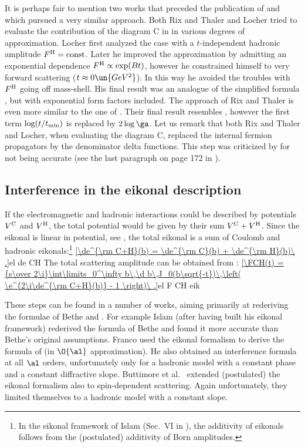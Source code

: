 It is perhaps fair to mention two works that preceded the publication of \WaY{}  and which pursued a very similar approach. Both Rix and Thaler  and Locher  tried to evaluate the contribution of the diagram C in  in various degrees of approximation. Locher first analyzed the case with a $t$-independent hadronic amplitude $F^{\rm H}=\hbox{const}$. Later he improved the approximation by admitting an exponential dependence $F^{\rm H} \propto \exp(Bt)$, however he constrained himself to very forward scattering ($t\approx 0\un{GeV^2}$). In this way he avoided the troubles with $F^{\rm H}$ going off mass-shell. His final result was an analogue of the simplified \WaY{} formula , but with exponential form factors included. The approach of Rix and Thaler is even more similar to the one of \WaY. Their final result resembles , however the first term $\log(t/t_{\rm min})$ is replaced by $2\log\ga$. Let us remark that both Rix and Thaler and Locher, when evaluating the diagram C, replaced the internal fermion propagators by the denominator delta functions. This step was criticized by \WaY{} for not being accurate (see the last paragraph on page 172 in ).



\subsection[int eik]{Interference in the eikonal description}

If the electromagnetic and hadronic interactions could be described by potentials $V^{\rm C}$ and $V^{\rm H}$, the total potential would be given by their sum $V^{\rm C} + V^{\rm H}$. Since the eikonal is linear in potential, see , the total eikonal is a sum of Coulomb and hadronic eikonals:\footnote{%
In the eikonal framework of Islam (Sec.~VI in ), the additivity of eikonals follows from the (postulated) additivity of Born amplitudes.
}
\eqref{\de^{\rm C+H}(b) = \de^{\rm C}(b) + \de^{\rm H}(b)\ .}{el de CH}
The total scattering amplitude can be obtained from :
\eqref{\FCH(t) = {s\over 2\i}\int\limits_0^\infty b\,\d b\,J_0(b\sqrt{-t})\,\left( \e^{2\i\de^{\rm C+H}(b)} - 1 \right)\ .}{el F CH eik}

These steps can be found in a number of works, aiming primarily at rederiving the formulae of Bethe  and \WY{} .
  For example Islam  (after having built his eikonal framework) rederived the formula of Bethe and found it more accurate than Bethe's original assumptions.
  Franco  used the eikonal formalism to derive the formula of \WY{} (in $\O{\al}$ approximation). He also obtained an interference formula at all $\al$ orders, unfortunately only for a hadronic model with a constant phase and a constant diffractive slope.
  Buttimore et al.~ extended (postulated) the eikonal formalism also to spin-dependent scattering. Again unfortunately, they limited themselves to a hadronic model with a constant slope.

